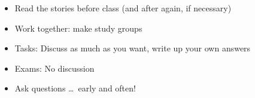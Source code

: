 \documentclass[a4paper,landscape,headrule,footrule,xetex,25pt]{foils}
\begin{document}

\begin{itemize}
\item Read the stories before class (and after again, if necessary)
\item Work together: make study groups
\item Tasks: Discuss as much as you want, write up your own answers
\item Exams: No discussion
\item Ask questions \ldots\ early and often!
\end{itemize}



\end{document}
